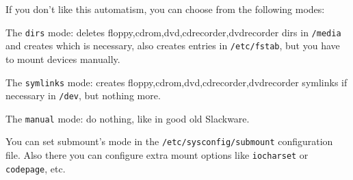 If you don't like this automatism, you can choose from the following modes:

The {\tt dirs} mode: deletes floppy,cdrom,dvd,cdrecorder,dvdrecorder dirs in {\tt /media} and creates which is necessary, also creates entries in {\tt /etc/fstab}, but you have to mount devices manually.

The {\tt symlinks} mode: creates floppy,cdrom,dvd,cdrecorder,dvdrecorder symlinks if necessary in {\tt /dev}, but nothing more.

The {\tt manual} mode: do nothing, like in good old Slackware.

You can set submount's mode in the {\tt /etc/sysconfig/submount} configuration file. Also there you can configure extra mount options like {\tt iocharset} or {\tt codepage}, etc.
